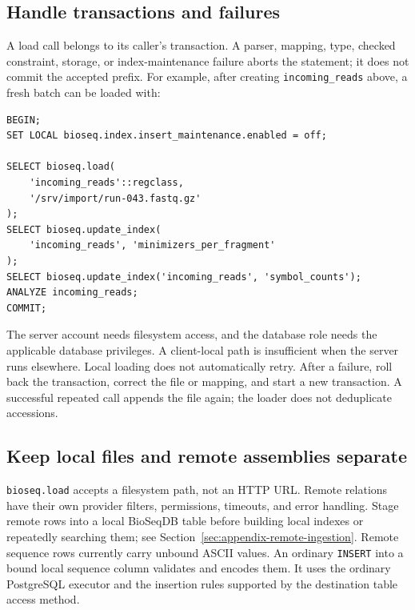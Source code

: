\subsection{Handle transactions and failures}

A load call belongs to its caller's transaction. A parser, mapping, type,
checked constraint, storage, or index-maintenance failure aborts the
statement; it does not commit the accepted prefix. For example, after
creating \texttt{incoming\_reads} above, a fresh batch can be loaded with:
\par\noindent\begin{minipage}{\linewidth}
\begin{lstlisting}[style=bioseq-appendix-sql]
BEGIN;
SET LOCAL bioseq.index.insert_maintenance.enabled = off;

SELECT bioseq.load(
    'incoming_reads'::regclass,
    '/srv/import/run-043.fastq.gz'
);
SELECT bioseq.update_index(
    'incoming_reads', 'minimizers_per_fragment'
);
SELECT bioseq.update_index('incoming_reads', 'symbol_counts');
ANALYZE incoming_reads;
COMMIT;
\end{lstlisting}
\end{minipage}

The server account needs filesystem access, and the database role needs the
applicable database privileges. A client-local path is insufficient when the
server runs elsewhere. Local loading does not automatically retry. After a
failure, roll back the transaction, correct the file or mapping, and start a
new transaction. A successful repeated call appends the file again; the
loader does not deduplicate accessions.

\subsection{Keep local files and remote assemblies separate}

\texttt{bioseq.load} accepts a filesystem path, not an HTTP URL. Remote
relations have their own provider filters, permissions, timeouts, and error
handling. Stage remote rows into a local BioSeqDB table before building local
indexes or repeatedly searching them; see
Section~\ref{sec:appendix-remote-ingestion}. Remote sequence rows currently carry
unbound ASCII values. An ordinary \texttt{INSERT} into a bound local sequence
column validates and encodes them. It uses the ordinary PostgreSQL executor
and the insertion rules supported by the destination table access method.

